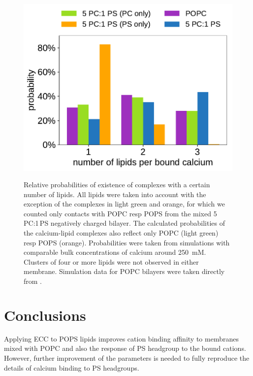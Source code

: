 \documentclass[journal=jpcbfk,manuscript=article]{achemso}
\newlength{\figwidth}
\begin{document}
\begin{figure}[tb!] 
  \centering 
  \includegraphics[width=\figwidth]{../img/stoichiometry_CaCl2_comparison_Ecc-lipids_PC-vs-PCPS.pdf} \\ 
  \caption{\label{fig:cacl_complexes} 
      Relative probabilities of existence of  complexes 
      with a certain number of lipids.  
      All lipids were taken into account with the exception of the complexes in light green and orange, 
      for which we counted only contacts with POPC resp POPS from the mixed 5\,PC:1\,PS negatively charged bilayer. 
      The calculated probabilities of the calcium-lipid complexes also reflect only POPC (light green) resp POPS (orange). 
      Probabilities were taken from simulations with comparable bulk concentrations of calcium around 250~mM. 
      Clusters of four or more lipids were not observed in either membrane. 
      Simulation data for POPC bilayers were taken directly from \cite{melcr18}. 
  } 
\end{figure} 









 
 
 
 
 
\section{Conclusions} 

Applying ECC to POPS lipids improves cation binding affinity to membranes
mixed with POPC and also the response of PS headgroup to the bound cations.
However, further improvement of the parameters is needed to fully reproduce the
details of calcium binding to PS headgroups.
\end{document}
